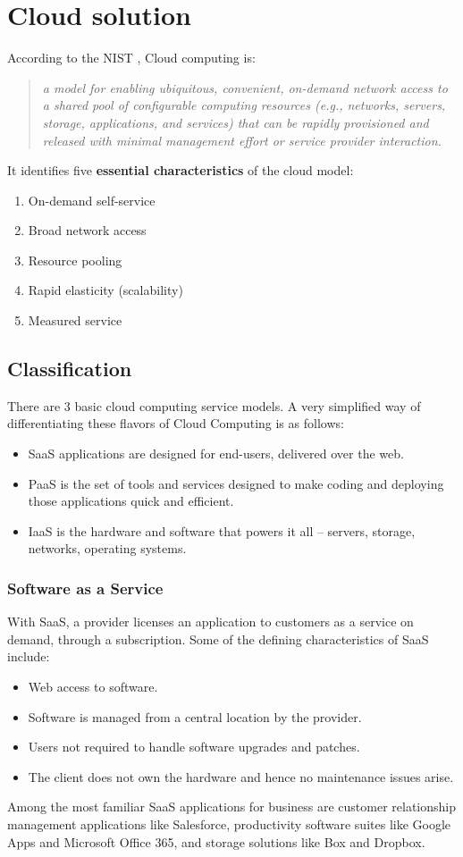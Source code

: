 \documentclass[12pt,a4paper,oneside]{article}
\begin{document}
\section{Cloud solution}
According to the NIST \cite{ref0}, Cloud computing is:
\begin{quote}
\emph{a model for enabling ubiquitous, convenient, on-demand network access to
a shared pool of configurable computing resources (e.g., networks, servers,
storage, applications, and services) that can be rapidly provisioned and
released with minimal management effort or service provider interaction.}
\end{quote}

\noindent
It identifies five \textbf{essential characteristics} of the cloud model:
\begin{enumerate}
	\item On-demand self-service
	\item Broad network access
	\item Resource pooling
	\item Rapid elasticity (scalability)
	\item Measured service
\end{enumerate}

\subsection{Classification}
There are 3 basic cloud computing service models. A very simplified way of
differentiating these flavors of Cloud Computing is as follows:
\begin{itemize}
	\item SaaS applications are designed for end-users, delivered over the
		web.
	\item PaaS is the set of tools and services designed to make coding and
		deploying those applications quick and efficient.
	\item IaaS is the hardware and software that powers it all -- servers,
		storage, networks, operating systems.
\end{itemize}

\subsubsection{Software as a Service}
With SaaS, a provider licenses an application to customers as a service on
demand, through a subscription. Some of the defining characteristics of SaaS
include:
\begin{itemize}
	\item Web access to software.
	\item Software is managed from a central location by the provider.
	\item Users not required to handle software upgrades and patches.
	\item The client does not own the hardware and hence no maintenance
		issues arise.
\end{itemize}
Among the most familiar SaaS applications for business are customer
relationship management applications like Salesforce, productivity software
suites like Google Apps and Microsoft Office 365, and storage solutions like
Box and Dropbox.
\end{document}
